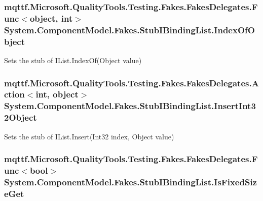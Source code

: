 \hypertarget{class_system_1_1_component_model_1_1_fakes_1_1_stub_i_binding_list_a65068eb5eac5a39762aad8a25c4fe01b}{
\subsubsection[{Index\-Of\-Object}]{\setlength{\rightskip}{0pt plus 5cm}mqttf.\-Microsoft.\-Quality\-Tools.\-Testing.\-Fakes.\-Fakes\-Delegates.\-Func$<$object, int$>$ System.\-Component\-Model.\-Fakes.\-Stub\-I\-Binding\-List.\-Index\-Of\-Object}}\label{class_system_1_1_component_model_1_1_fakes_1_1_stub_i_binding_list_a65068eb5eac5a39762aad8a25c4fe01b}


Sets the stub of I\-List.\-Index\-Of(\-Object value)

\hypertarget{class_system_1_1_component_model_1_1_fakes_1_1_stub_i_binding_list_a9d9bd165683014f31f1635d83b4048e5}{
\subsubsection[{Insert\-Int32\-Object}]{\setlength{\rightskip}{0pt plus 5cm}mqttf.\-Microsoft.\-Quality\-Tools.\-Testing.\-Fakes.\-Fakes\-Delegates.\-Action$<$int, object$>$ System.\-Component\-Model.\-Fakes.\-Stub\-I\-Binding\-List.\-Insert\-Int32\-Object}}\label{class_system_1_1_component_model_1_1_fakes_1_1_stub_i_binding_list_a9d9bd165683014f31f1635d83b4048e5}


Sets the stub of I\-List.\-Insert(\-Int32 index, Object value)

\hypertarget{class_system_1_1_component_model_1_1_fakes_1_1_stub_i_binding_list_a9e2c181a55f6ab777c8bce4ae90bd002}{
\subsubsection[{Is\-Fixed\-Size\-Get}]{\setlength{\rightskip}{0pt plus 5cm}mqttf.\-Microsoft.\-Quality\-Tools.\-Testing.\-Fakes.\-Fakes\-Delegates.\-Func$<$bool$>$ System.\-Component\-Model.\-Fakes.\-Stub\-I\-Binding\-List.\-Is\-Fixed\-Size\-Get}}\label{class_system_1_1_component_model_1_1_fakes_1_1_stub_i_binding_list_a9e2c181a55f6ab777c8bce4ae90bd002}


